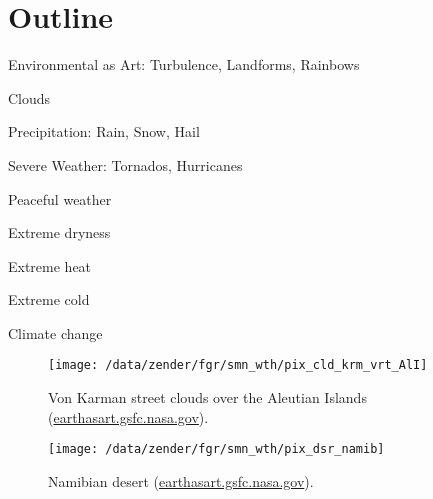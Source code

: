 \documentclass[12pt]{article}
\begin{document}
\csznote{
\begin{abstract}
\Large
\setlength{\baselineskip}{12.0pt} %
\noindent \smnttl
\end{abstract}
\clearpage
} %

\begin{print}
\tableofcontents
\end{print}
\begin{screen}
\vfill
\end{screen}


\Large
\section[Outline]{Outline}
\begin{itemize*}
\item Environmental as Art: Turbulence, Landforms, Rainbows
\item Clouds
\item Precipitation: Rain, Snow, Hail
\item Severe Weather: Tornados, Hurricanes
\item Peaceful weather
\item Extreme dryness
\item Extreme heat
\item Extreme cold
\item Climate change
\end{itemize*}
\clearpage

\Large
\begin{figure*}
\centering\vspace{-0.25in}
\texttt{[image: /data/zender/fgr/smn\_wth/pix\_cld\_krm\_vrt\_AlI]}%
\caption{
Von Karman street clouds over the Aleutian Islands
(\href{http://earthasart.gsfc.nasa.gov/images/von_kar_hires.jpg}{earthasart.gsfc.nasa.gov}).
\label{fgr:pix_cld_krm_vrt_AlI}}
\end{figure*}
\clearpage

\Large
\begin{figure*}
\centering\vspace{-0.25in}
\texttt{[image: /data/zender/fgr/smn\_wth/pix\_dsr\_namib]}%
\caption{
Namibian desert
(\href{http://earthasart.gsfc.nasa.gov/images/namib_hires.jpg}{earthasart.gsfc.nasa.gov}).
\label{fgr:pix_dsr_namib}}
\end{figure*}
\clearpage
\end{document}
